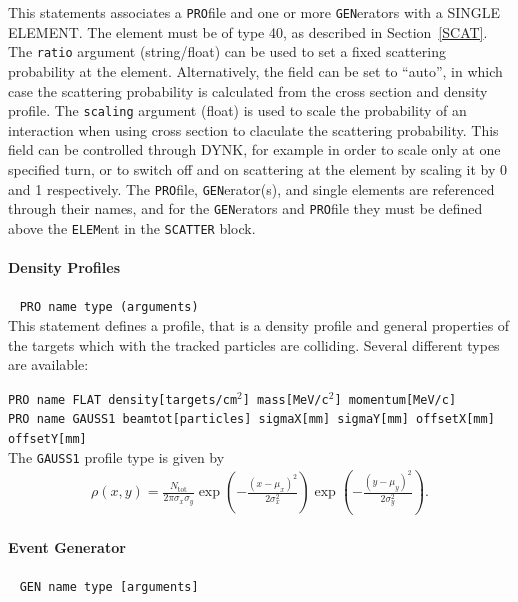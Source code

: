 This statements associates a \texttt{PRO}file and one or more \texttt{GEN}erators with a SINGLE ELEMENT.
The element must be of type 40, as described in Section~\ref{SCAT}.
The \texttt{ratio} argument (string/float) can be used to set a fixed scattering probability at the element.
Alternatively, the field can be set to ``auto'', in which case the scattering probability is calculated from the cross section and density profile.
The \texttt{scaling} argument (float) is used to scale the probability of an interaction when using cross section to claculate the scattering probability.
This field can be controlled through DYNK, for example in order to scale only at one specified turn, or to switch off and on scattering at the element by scaling it by 0 and 1 respectively.
The \texttt{PRO}file, \texttt{GEN}erator(s), and single elements are referenced through their names, and for the \texttt{GEN}erators and \texttt{PRO}file they must be defined above the \texttt{ELEM}ent in the \texttt{SCATTER} block.

\paragraph{Density Profiles}~ \texttt{PRO name type (arguments)} \\

This statement defines a profile, that is a density profile and general properties of the targets which with the tracked particles are colliding.
Several different types are available:

\bigskip
\noindent\texttt{PRO name FLAT density[targets/cm$^2$] mass[MeV/c$^2$] momentum[MeV/c]}\\

\bigskip
\noindent\texttt{PRO name GAUSS1 beamtot[particles] sigmaX[mm] sigmaY[mm] offsetX[mm] offsetY[mm]} \\

The \texttt{GAUSS1} profile type is given by
\begin{align}
    \rho(x,y) = \frac{N_{\mathrm{tot}}}{2\pi\sigma_x\sigma_y}
                \exp\left(-\frac{(x-\mu_x)^2}{2\sigma_x^2}\right)
                \exp\left(-\frac{(y-\mu_y)^2}{2\sigma_y^2}\right).
\end{align}

\paragraph{Event Generator}~ \texttt{GEN name type [arguments]} \\

